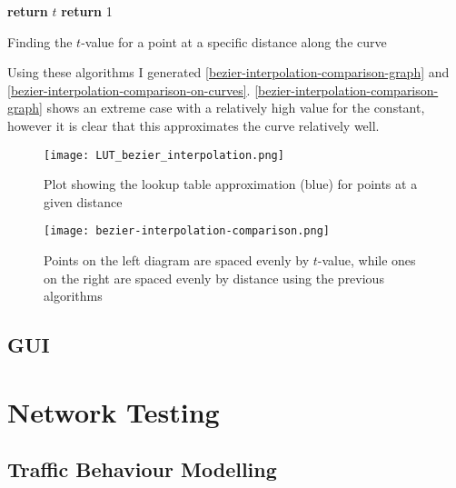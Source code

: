     \begin{algorithm}
        \begin{algorithmic}
                        \State \textbf{return} $t$
                    \EndIf
                \EndFor
                \State \textbf{return} 1
            \EndFunction
        \end{algorithmic}
        \caption{Finding the $t$-value for a point at a specific distance along the curve}
        \label{get-point-at-distance-algorithm}
    \end{algorithm}

    Using these algorithms I generated \autoref{bezier-interpolation-comparison-graph} and \autoref{bezier-interpolation-comparison-on-curves}. \autoref{bezier-interpolation-comparison-graph} shows an extreme case with a relatively high value for the  constant, however it is clear that this approximates the curve relatively well.

    \begin{figure}
        \centering
        \texttt{[image: LUT\_bezier\_interpolation.png]}
        \caption{Plot showing the lookup table approximation (blue) for points at a given distance}
        \label{bezier-interpolation-comparison-graph}
    \end{figure}

    \begin{figure}
        \centering
        \texttt{[image: bezier-interpolation-comparison.png]}
        \caption{Points on the left diagram are spaced evenly by $t$-value, while ones on the right are spaced evenly by distance using the previous algorithms}
        \label{bezier-interpolation-comparison-on-curves}
    \end{figure}

    \subsection{GUI}

\section{Network Testing}

    \subsection{Traffic Behaviour Modelling}

